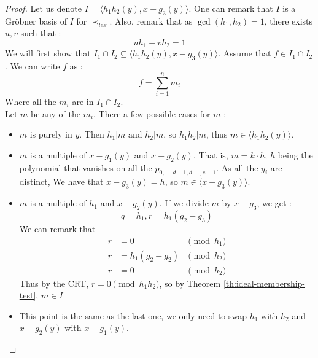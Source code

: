\documentclass{article}
\begin{document}
\begin{flushleft}
\begin{proof}
    Let us denote $I =  \langle h_{1}h_{2}(y), x - g_{3}(y) \rangle$. One can remark that $I$ is a Gröbner basis of $I$ for $\prec_{lex}$.
    Also, remark that as $\gcd(h_{1}, h_{2}) = 1$, there exists $u, v$ such that : 
    \begin{displaymath}
        uh_{1} + vh_{2} = 1
    \end{displaymath}
    We will first show that $I_{1} \cap I_{2} \subseteq \langle h_{1}h_{2}(y), x - g_{3}(y) \rangle$.
    Assume that $f \in I_{1} \cap I_{2}$. We can write $f$ as : 
    \begin{displaymath}
        f = \sum_{i = 1}^{n} m_{i}
    \end{displaymath}
    Where all the $m_{i}$ are in $I_{1} \cap I_{2}$. \\
    Let $m$ be any of the $m_{i}$. There a few possible cases for $m$ : 
    \begin{itemize}
        \item $m$ is purely in $y$. Then $h_{1} | m$ and $h_{2} | m$, so $h_{1}h_{2} | m$, thus $m \in \langle h_{1}h_{2}(y) \rangle$.
        \item $m$ is a multiple of $x - g_{1}(y)$ and $x - g_{2}(y)$. That is, $m = k \cdot h$, $h$ being the polynomial that vanishes on all the $p_{0,\dots,d-1,d,\dots,e-1}$. As all the $y_{i}$ are distinct, We have that $x - g_{3}(y) = h$, so $m \in \langle x - g_{3}(y) \rangle$.
        \item $m$ is a multiple of $h_{1}$ and $x - g_{2}(y)$. If we divide $m$ by $x - g_{3}$, we get : 
        \begin{displaymath}
            q = h_{1}, r = h_{1} (g_{2} - g_{3})
        \end{displaymath}
        We can remark that 
        \begin{align*}
            r & = 0 & \pmod{h_{1}} \\
            r & = h_{1} (g_{2} - g_{2}) & \pmod {h_{2}} \\
            r & = 0 & \pmod {h_{2}}
        \end{align*}
        Thus by the CRT, $r = 0 \pmod{h_{1}h_{2}}$, so by Theorem \ref{th:ideal-membership-test}, $m \in I$
        \item This point is the same as the last one, we only need to swap $h_{1}$ with $h_{2}$ and $x - g_{2}(y)$ with $x - g_{1}(y)$.
    \end{itemize} 
    

\end{proof}
\end{flushleft}
\end{document}
